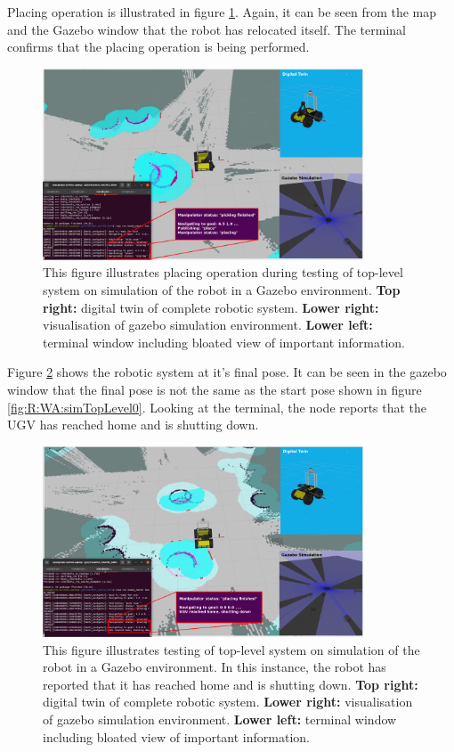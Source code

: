 Placing operation is illustrated in figure \ref{fig:R:WA:simTopLevel2}. Again, it can be seen from the map and the Gazebo window that the robot has relocated itself. The terminal confirms that the placing operation is being performed.

\begin{figure}[htp!]
  \centering
  \includegraphics[width = 0.85\textwidth]{Figures/figSimTopLevel2.pdf}
  \caption{This figure illustrates placing operation during testing of top-level system on simulation of the robot in a Gazebo environment. \textbf{Top right:} digital twin of complete robotic system. \textbf{Lower right:} visualisation of gazebo simulation environment. \textbf{Lower left:} terminal window including bloated view of important information.}
  \label{fig:R:WA:simTopLevel2}
\end{figure}

Figure \ref{fig:R:WA:simTopLevel3} shows the robotic system at it's final pose. It can be seen in the gazebo window that the final pose is not the same as the start pose shown in figure \ref{fig:R:WA:simTopLevel0}. Looking at the terminal, the node reports that the UGV has reached home and is shutting down.

\begin{figure}[htp!]
  \centering
  \includegraphics[width = 0.85\textwidth]{Figures/figSimTopLevel3.pdf}
  \caption{This figure illustrates testing of top-level system on simulation of the robot in a Gazebo environment. In this instance, the robot has reported that it has reached home and is shutting down. \textbf{Top right:} digital twin of complete robotic system. \textbf{Lower right:} visualisation of gazebo simulation environment. \textbf{Lower left:} terminal window including bloated view of important information.}
  \label{fig:R:WA:simTopLevel3}
\end{figure}


